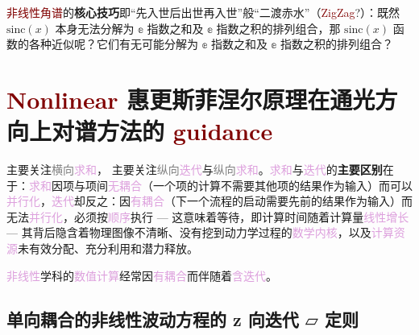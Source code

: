 \textcolor{Maroon}{非线性角谱}的\textbf{核心技巧}即“先入世后出世再入世”般“二渡赤水”（\textcolor{Maroon}{ZigZag}?）：既然 $\text{sinc} \left( x \right)$ 本身无法分解为 $\mathbb{e}$ 指数之和及 $\mathbb{e}$ 指数之积的排列组合，那 $\text{sinc} \left( x \right)$ 函数的各种近似呢？它们有无可能分解为 $\mathbb{e}$ 指数之和及 $\mathbb{e}$ 指数之积的排列组合？

\vspace*{-2.0em}

\section{\textcolor{Maroon}{Nonlinear} 惠更斯菲涅尔原理在通光方向上对谱方法的 \textcolor{Maroon}{guidance}}\label{sec:NHFP-z_guidance}

 主要关注\textcolor{gray}{横向}\textcolor{Plum}{求和}， 主要关注\textcolor{gray}{纵向}\textcolor{Plum}{迭代}与\textcolor{gray}{纵向}\textcolor{Plum}{求和}。\textcolor{Plum}{求和}与\textcolor{Plum}{迭代}的\textbf{主要区别}在于：\textcolor{Plum}{求和}因项与项间\textcolor{Plum}{无耦合}（一个项的计算不需要其他项的结果作为输入）而可以\textcolor{Plum}{并行化}，\textcolor{Plum}{迭代}却反之：因\textcolor{Plum}{有耦合}（下一个流程的启动需要先前的结果作为输入）而无法\textcolor{Plum}{并行化}，必须按\textcolor{Plum}{顺序}执行 --- 这意味着等待，即计算时间随着计算量\textcolor{Plum}{线性增长} --- 其背后隐含着\textcolor{NavyBlue}{物理图像}不清晰、没有挖到\textcolor{NavyBlue}{动力学过程}的\textcolor{Plum}{数学内核}，以及\textcolor{Plum}{计算资源}未有效分配、充分利用和潜力释放。

\textcolor{Plum}{非线性}学科的\textcolor{Plum}{数值计算}经常因\textcolor{Plum}{有耦合}而伴随着\textcolor{Plum}{含迭代}。

\subsection{单向耦合的非线性波动方程的 z 向迭代 \texorpdfstring{$\parallelogram$}{▱} 定则}\label{ssec:non-couple_NLwaveq_theorem}

